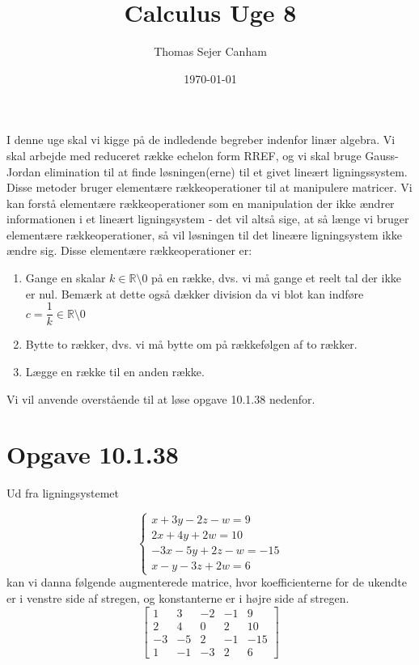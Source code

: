 \documentclass{article}
\title{Calculus Uge 8}
\author{Thomas Sejer Canham}
\date{\today}
\begin{document}
\begin{titlepage}
 \maketitle
 \thispagestyle{empty}
\end{titlepage}

I denne uge skal vi kigge på de indledende begreber indenfor linær algebra. 
Vi skal arbejde med reduceret række echelon form RREF, og vi skal bruge Gauss-Jordan elimination til at finde løsningen(erne) til et givet lineært ligningssystem. Disse metoder bruger elementære rækkeoperationer til at manipulere matricer. Vi kan forstå elementære rækkeoperationer som en manipulation der ikke ændrer informationen i et lineært ligningsystem - det vil altså sige, at så længe vi bruger elementære rækkeoperationer, så vil løsningen til det lineære ligningsystem ikke ændre sig. Disse elementære rækkeoperationer er:
\begin{enumerate}
    \item Gange en skalar $k \in \mathbb{R} \setminus 0$ på en række, dvs. vi må gange et reelt tal der ikke er nul. Bemærk at dette også dækker division da vi blot kan indføre $c = \dfrac{1}{k} \in  \mathbb{R} \setminus 0$
    \item Bytte to rækker, dvs. vi må bytte om på rækkefølgen af to rækker.
    \item Lægge en række til en anden række.
\end{enumerate}
Vi vil anvende overstående til at løse opgave 10.1.38 nedenfor.

\section*{Opgave 10.1.38}
Ud fra ligningsystemet 

\begin{equation}
\begin{cases}
x + 3y - 2z - w = 9 \\
2x + 4y + 2w = 10 \\
-3x - 5y + 2z - w = -15 \\
x - y - 3z + 2w = 6
\end{cases}
\end{equation}
kan vi danna følgende augmenterede matrice, hvor koefficienterne for de ukendte er i venstre side af stregen, og konstanterne er i højre side af stregen.
\begin{equation}
\left[
\begin{array}{rrrr|r}
1 & 3 & -2 & -1 & 9 \\
2 & 4 & 0 & 2 & 10 \\
-3 & -5 & 2 & -1 & -15 \\
1 & -1 & -3 & 2 & 6
\end{array}
\right]
\end{equation}
\end{document}
